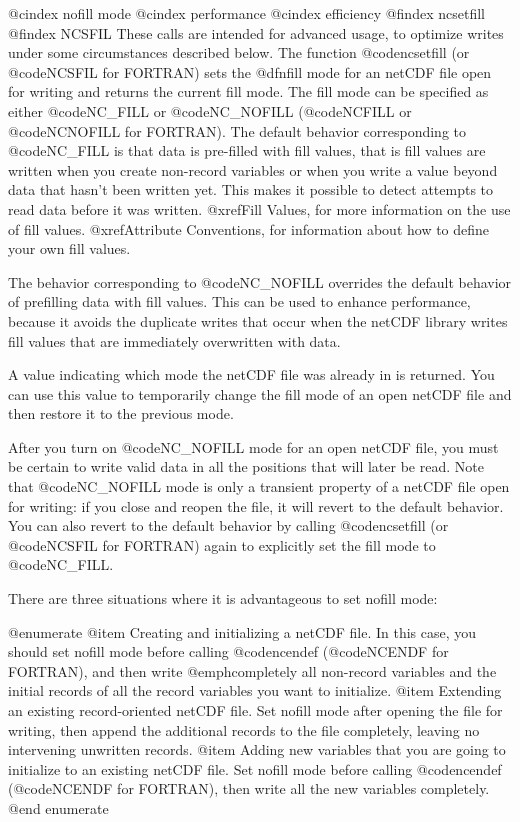 @cindex nofill mode
@cindex performance
@cindex efficiency
@findex ncsetfill
@findex NCSFIL
These calls are intended for advanced usage, to optimize writes under
some circumstances described below.  The function @code{ncsetfill} (or
@code{NCSFIL} for FORTRAN) sets the @dfn{fill mode} for an netCDF file
open for writing and returns the current fill mode.  The fill mode can
be specified as either @code{NC_FILL} or @code{NC_NOFILL} (@code{NCFILL}
or @code{NCNOFILL} for FORTRAN).  The default behavior corresponding to
@code{NC_FILL} is that data is pre-filled with fill values, that is fill
values are written when you create non-record variables or when you
write a value beyond data that hasn't been written yet.  This makes it
possible to detect attempts to read data before it was written.
@xref{Fill Values}, for more information on the use of fill values.
@xref{Attribute Conventions}, for information about how to define your
own fill values.

The behavior corresponding to @code{NC_NOFILL} overrides the default
behavior of prefilling data with fill values.  This can be used to
enhance performance, because it avoids the duplicate writes that occur
when the netCDF library writes fill values that are immediately
overwritten with data.

A value indicating which mode the netCDF file was already in is
returned.  You can use this value to temporarily change the fill mode of
an open netCDF file and then restore it to the previous mode.

After you turn on @code{NC_NOFILL} mode for an open netCDF file, you
must be certain to write valid data in all the positions that will later
be read.  Note that @code{NC_NOFILL} mode is only a transient property
of a netCDF file open for writing: if you close and reopen the file, it
will revert to the default behavior.  You can also revert to the default
behavior by calling @code{ncsetfill} (or @code{NCSFIL} for FORTRAN)
again to explicitly set the fill mode to @code{NC_FILL}.

There are three situations where it is advantageous to set nofill mode:

@enumerate
@item
Creating and initializing a netCDF file.  In this case, you should set
nofill mode before calling @code{ncendef} (@code{NCENDF} for FORTRAN),
and then write @emph{completely} all non-record variables and the
initial records of all the record variables you want to initialize.
@item
Extending an existing record-oriented netCDF file.  Set nofill mode
after opening the file for writing, then append the additional records
to the file completely, leaving no intervening unwritten records.
@item
Adding new variables that you are going to initialize to an existing
netCDF file.  Set nofill mode before calling @code{ncendef}
(@code{NCENDF} for FORTRAN), then write all the new variables
completely.
@end enumerate

